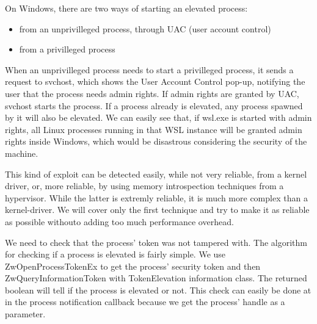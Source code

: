\documentclass[conference]{IEEEtran}
\begin{document}
    \par{}
    On Windows, there are two ways of starting an elevated process:
    \begin{itemize}
        \item from an unprivilleged process, through UAC (user account control)
        \item from a privilleged process
    \end{itemize}

    \par{}
    When an unprivilleged process needs to start a privilleged process, it sends a request to svchost, which shows the User Account Control pop-up,
    notifying the user that the process needs admin rights. If admin rights are granted by UAC, svchost starts the process. If a process already
    is elevated, any process spawned by it will also be elevated. We can easily see that, if wsl.exe is started with admin rights, all Linux
    processes running in that WSL instance will be granted admin rights inside Windows, which would be disastrous considering the security
    of the machine.\\
    
    \par{}
    This kind of exploit can be detected easily, while not very reliable, from a kernel driver, or, more reliable, by using memory introspection
    techniques from a hypervisor. While the latter is extremly reliable, it is much more complex than a kernel-driver. We will cover only the
    first technique and try to make it as reliable as possible withouto adding too much performance overhead.\\
    
    \par{}
    We need to check that the process' token was not tampered with. The algorithm for checking if a process is elevated is fairly simple. We use
    ZwOpenProcessTokenEx to get the process' security token and then ZwQueryInformationToken with TokenElevation information class. The
    returned boolean will tell if the process is elevated or not. This check can easily be done at in the process notification callback because
    we get the process' handle as a parameter.\\
    
\end{document}
